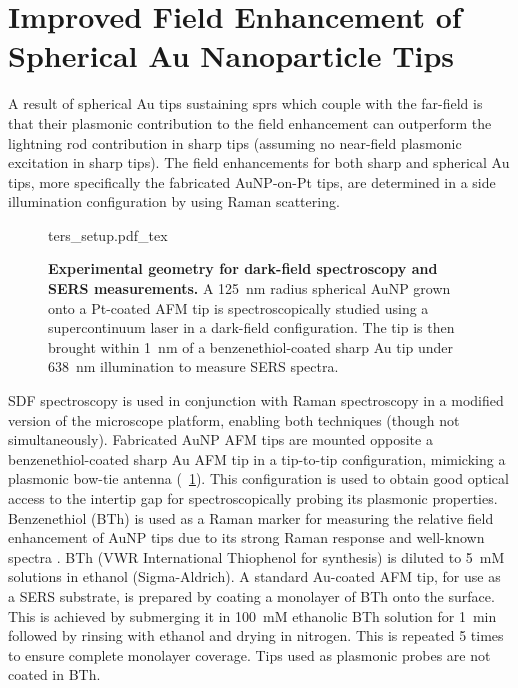 \documentclass{article}
\begin{document}
\section{Improved Field Enhancement of Spherical Au Nanoparticle Tips}
\label{sec:tip_applications}

A result of spherical Au tips sustaining \glspl{spr} which couple with the far-field is that their plasmonic contribution to the field enhancement can outperform the lightning rod contribution in sharp tips (assuming no near-field plasmonic excitation in sharp tips). The field enhancements for both sharp and spherical Au tips, more specifically the fabricated AuNP-on-Pt tips, are determined in a side illumination configuration by using Raman scattering.

\begin{figure}[bt]
\centering
\def\svgwidth{0.6\textwidth}\fontsize{10pt}{1em}\selectfont
{ters_setup.pdf_tex}
\caption[Experimental geometry for dark-field spectroscopy and SERS measurements]{\textbf{Experimental geometry for dark-field spectroscopy and SERS measurements.} A \SI{125}{nm} radius spherical AuNP grown onto a Pt-coated AFM tip is spectroscopically studied using a supercontinuum laser in a dark-field configuration. The tip is then brought within \SI{1}{nm} of a benzenethiol-coated sharp Au tip under \SI{638}{nm} illumination to measure SERS spectra.}
\label{fig:ters_setup}
\end{figure}

SDF spectroscopy is used in conjunction with Raman spectroscopy in a modified version of the microscope platform, enabling both techniques (though not simultaneously). Fabricated AuNP AFM tips are mounted opposite a benzenethiol-coated sharp Au AFM tip in a tip-to-tip configuration, mimicking a plasmonic bow-tie antenna (\figurename~\ref{fig:ters_setup}). This configuration is used to obtain good optical access to the intertip gap for spectroscopically probing its plasmonic properties. Benzenethiol (BTh) is used as a Raman marker for measuring the relative field enhancement of AuNP tips due to its strong Raman response and well-known spectra \cite{mahajan2009, dudin2010}.
BTh (VWR International Thiophenol for synthesis) is diluted to \SI{5}{mM} solutions in ethanol (Sigma-Aldrich). A standard Au-coated AFM tip, for use as a SERS substrate, is prepared by coating a monolayer of BTh onto the surface. This is achieved by submerging it in \SI{100}{mM} ethanolic BTh solution for \SI{1}{\minute} followed by rinsing with ethanol and drying in nitrogen. This is repeated 5 times to ensure complete monolayer coverage. Tips used as plasmonic probes are not coated in BTh.
\end{document}
